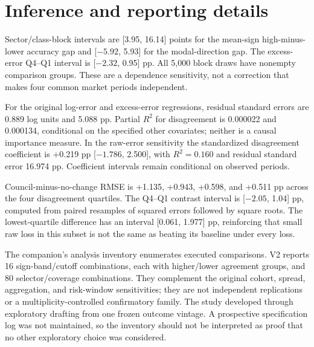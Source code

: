 \section{Inference and reporting details}

Sector/class-block intervals are [3.95, 16.14] points for the mean-sign high-minus-lower accuracy gap and [$-5.92$, 5.93] for the modal-direction gap. The excess-error Q4--Q1 interval is [$-2.32$, 0.95] pp. All 5,000 block draws have nonempty comparison groups. These are a dependence sensitivity, not a correction that makes four common market periods independent.

For the original log-error and excess-error regressions, residual standard errors are 0.889 log units and 5.088 pp. Partial $R^2$ for disagreement is 0.000022 and 0.000134, conditional on the specified other covariates; neither is a causal importance measure. In the raw-error sensitivity the standardized disagreement coefficient is +0.219 pp [$-1.786$, 2.500], with $R^2=0.160$ and residual standard error 16.974 pp. Coefficient intervals remain conditional on observed periods.

Council-minus-no-change RMSE is +1.135, +0.943, +0.598, and +0.511 pp across the four disagreement quartiles. The Q4--Q1 contrast interval is [$-2.05$, 1.04] pp, computed from paired resamples of squared errors followed by square roots. The lowest-quartile difference has an interval [0.061, 1.977] pp, reinforcing that small raw loss in this subset is not the same as beating its baseline under every loss.

The companion's analysis inventory enumerates executed comparisons. V2 reports 16 sign-band/cutoff combinations, each with higher/lower agreement groups, and 80 selector/coverage combinations. They complement the original cohort, spread, aggregation, and risk-window sensitivities; they are not independent replications or a multiplicity-controlled confirmatory family. The study developed through exploratory drafting from one frozen outcome vintage. A prospective specification log was not maintained, so the inventory should not be interpreted as proof that no other exploratory choice was considered.


